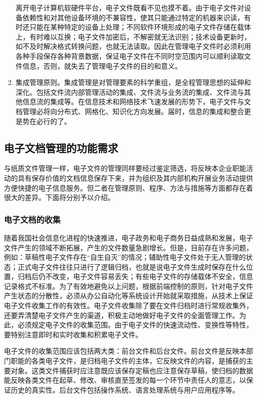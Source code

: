 \begin{enumerate}
        离开电子计算机软硬件平台，电子文件既看不见也摸不着。由于电子文件对设备依赖性和对其他设备环境的不兼容性，使其只能通过特定的机器来识读，有时还只能在某种特定的设备上处理；不同软件环境形成的电子文件存储在载体上，有时难以互换；电子文件加密后，不解密就无法识别；技术设备更新时，如不及时解决格式转换问题，也就无法读取。因此在管理电子文件时必须利用各种手段保存各种背景数据，保证电子文件在不同时空范围内可以顺利读取文件信息，否则，就失去了管理电子文件的目的和意义。

        \item 集成管理原则。集成管理是对管理要素的科学重组，是全程管理思想的延伸和深化。包括文件流内部管理活动的集成、文件流与业务流的集成、文件流与其他信息流的集成等。在信息技术和网络技术飞速发展的形势下，电子文件与文档管理必将向分布式、网格化、知识化方向发展。届时，信息的集成和整合更是势在必行的了。
    \end{enumerate}

    \subsection {电子文档管理的功能需求}

    与纸质文件管理一样，电子文件的管理同样要经过鉴定筛选，将反映本企业职能活动的具有保存价值的文档信息保存下来，并为组织及其内部机构开展业务活动提供方便快捷的电子信息服务。但二者在管理原则、程序、方法与措施等方面都存在着很大的差异。下面将分别予以介绍。

    \subsubsection {电子文档的收集}

    随着我国社会信息化进程的快速推进，电子政务和电子商务日益成熟和发展，电子文件产生的领域不断拓展，产生的文件数量急剧增长。但是，目前存在许多问题，例如：草稿性电子文件存在“自生自灭”的情况；辅助性电子文件处于无人管理的状态；正式电子文件往往只进行了逻辑归档，也就是说电子文件生成时保存在什么位置，归档后仍不改变，电子文件容易丢失；有些电子文件的存储载体不安全，信息记录格式不标准。为了有效地避免以上问题，根据前端控制的原则，针对电子文件产生状态的分散性，必须从办公自动化等系统设计开始就采取措施，从技术上保证电子文件收集工作的有效性。电子文件收集除了要在文件归档时进行常规收集外，还要弄清楚电子文件产生的渠道，积极主动地做好电子文件的全面管理工作。为此，必须规定电子文件的收集范围。由于电子文件的快速流动性、变换性等特性，要特别注意即时和实时收集和积累电子文件。

    电子文件的收集范围应该包括两大类：前台文件和后台文件。前台文件是反映本部门职能的各类电子文件，是归档电子文件的主体，它反映文件的内容，是捕获的主要对象。这类文件捕获时应注意既应该保存定稿也应注意保存草稿，使归档的数据能反映各类文件在起草、修改、审核直至签发的每一个环节中责任人的意志，以保证历史的真实性。后台文件包括操作系统、语言处理系统与用户应用程序等。


